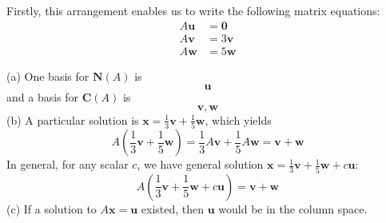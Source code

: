 \documentclass[a4paper]{article}
\begin{document}
Firstly, this arrangement enables us to write the following matrix equations:
\begin{align*}
	A \bm{u} & = \bm{0} \\
	A \bm{v} & = 3 \bm{v} \\ 
	A \bm{w} & = 5 \bm{w}
\end{align*}

(a) One basis for \(\textbf{N} \!\left( A \right) \) is
\[
	\bm{u}
\]
and a basis for \(\textbf{C} \!\left( A \right) \) is
\[
	\bm{v}, \bm{w}
\]
(b) A particular solution is \(\bm{x} = \displaystyle{\frac{1}{3}} \bm{v} + \frac{1}{5} \bm{w}\), which yields
\[
	A \!\left( \frac{1}{3} \bm{v} + \frac{1}{5}\bm{w} \right) = \frac{1}{3} A \bm{v} + \frac{1}{5} A \bm{w} = \bm{v} + \bm{w}
\]
In general, for any scalar \(c\), we have general solution \(\bm{x} = \frac{1}{3} \bm{v} + \frac{1}{5} \bm{w} + c \bm{u}\):
\[
	A \!\left( \frac{1}{3} \bm{v} + \frac{1}{5} \bm{w} + c \bm{u} \right) = \bm{v} + \bm{w}
\]
(c) If a solution to \(A \bm{x} = \bm{u}\) existed, then \(\bm{u}\) would be in the column space.

\vspace{12pt}

\end{document}

